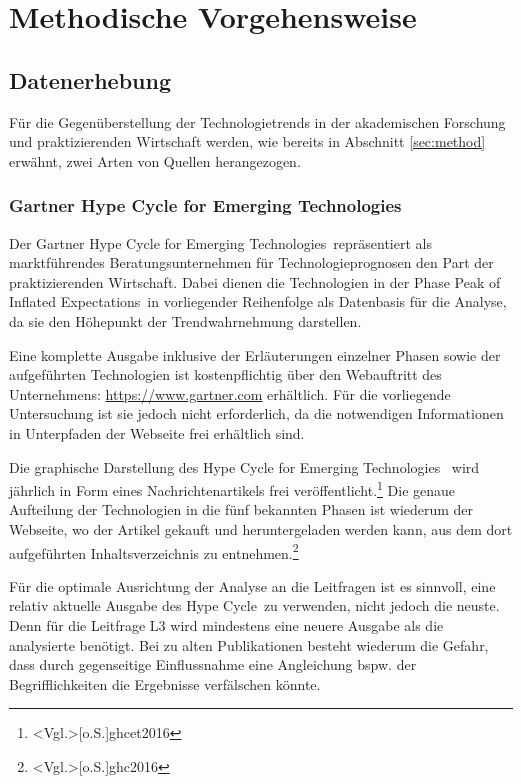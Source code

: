 \section{Methodische Vorgehensweise}
\subsection{Datenerhebung}
Für die Gegenüberstellung der Technologietrends in der akademischen Forschung und praktizierenden Wirtschaft werden, wie bereits in Abschnitt \ref{sec:method} erwähnt, zwei Arten von Quellen herangezogen.

\subsubsection{Gartner Hype Cycle for Emerging Technologies}\label{sec:ghcet}
Der \glqq Gartner Hype Cycle for Emerging Technologies\grqq~repräsentiert als markt\-führendes Beratungsunternehmen für Technologieprognosen den Part der praktizierenden Wirtschaft. Dabei dienen die Technologien in der Phase \glqq Peak of Inflated Expectations\grqq~in vorliegender Reihenfolge als Datenbasis für die Analyse, da sie den Höhepunkt der Trendwahrnehmung darstellen.

Eine komplette Ausgabe inklusive der Erläuterungen einzelner Phasen sowie der aufgeführten Technologien ist kostenpflichtig über den Webauftritt des Unternehmens: \url{https://www.gartner.com} erhältlich. Für die vorliegende Untersuchung ist sie jedoch nicht erforderlich, da die notwendigen Informationen in Unterpfaden der Webseite frei erhältlich sind.

Die graphische Darstellung des \glqq Hype Cycle for Emerging Technologies \grqq~wird jährlich in Form eines Nachrichtenartikels frei veröffentlicht.\footnote{\citeNP<Vgl.>[o.S.]{ghcet2016}}
Die genaue Aufteilung der Technologien in die fünf bekannten Phasen ist wiederum der Webseite, wo der Artikel gekauft und heruntergeladen werden kann, aus dem dort aufgeführten Inhaltsverzeichnis zu entnehmen.\footnote{\citeNP<Vgl.>[o.S.]{ghc2016}}

Für die optimale Ausrichtung der Analyse an die Leitfragen ist es sinnvoll, eine relativ aktuelle Ausgabe des \glqq Hype Cycle\grqq~zu verwenden, nicht jedoch die neuste. Denn für die Leitfrage L3 wird mindestens eine neuere Ausgabe als die analysierte benötigt. Bei zu alten Publikationen besteht wiederum die Gefahr, dass durch gegenseitige Einflussnahme eine Angleichung bspw. der Begrifflichkeiten die Ergebnisse verfälschen könnte.

